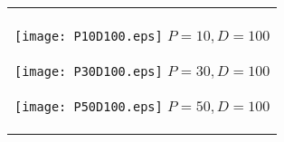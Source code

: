 \documentclass[a4paper,11pt,oneside,openany]{jsbook}
\begin{document}
\begin{figure}[htbp]
  \begin{center}
    \begin{tabular}{c}


      \begin{minipage}{0.33\hsize}
        \begin{center}
          \texttt{[image: P10D100.eps]}
          \hspace{1.2cm} $P=10, D=100$
        \end{center}
      \end{minipage}

      \begin{minipage}{0.33\hsize}
        \begin{center}
          \texttt{[image: P30D100.eps]}
          \hspace{1.2cm} $P=30, D=100$
        \end{center}
      \end{minipage}

      \begin{minipage}{0.33\hsize}
        \begin{center}
          \texttt{[image: P50D100.eps]}
          \hspace{1.2cm} $P=50, D=100$
        \end{center}
      \end{minipage}
    \end{tabular}
    \label{fig:lena}
  \end{center}
\end{figure}
\end{document}
